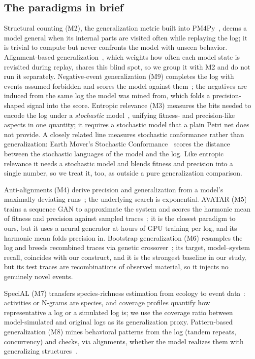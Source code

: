 \documentclass[runningheads]{llncs}
\begin{document}
\subsection{The paradigms in brief}
Structural counting (M2), the generalization metric built into PM4Py~\cite{buijs2014quality,berti2019pm4py}, deems a model general when its internal parts are visited often while replaying the log; it is trivial to compute but never confronts the model with unseen behavior. Alignment-based generalization~\cite{vanderaalst2016pm}, which weights how often each model state is revisited during replay, shares this blind spot, so we group it with M2 and do not run it separately. Negative-event generalization (M9) completes the log with events assumed forbidden and scores the model against them~\cite{vandenbroucke2014negative}; the negatives are induced from the same log the model was mined from, which folds a precision-shaped signal into the score. Entropic relevance (M3) measures the bits needed to encode the log under a \emph{stochastic} model~\cite{alkhammash2022entropic}, unifying fitness- and precision-like aspects in one quantity; it requires a stochastic model that a plain Petri net does not provide. A closely related line measures stochastic conformance rather than generalization: Earth Mover's Stochastic Conformance~\cite{leemans2019emsc} scores the distance between the stochastic languages of the model and the log. Like entropic relevance it needs a stochastic model and blends fitness and precision into a single number, so we treat it, too, as outside a pure generalization comparison.

Anti-alignments (M4) derive precision and generalization from a model's maximally deviating runs~\cite{vandongen2016anti}; the underlying search is exponential. AVATAR (M5) trains a sequence GAN to approximate the system and scores the harmonic mean of fitness and precision against sampled traces~\cite{theis2020avatar}; it is the closest paradigm to ours, but it uses a neural generator at hours of GPU training per log, and its harmonic mean folds precision in. Bootstrap generalization (M6) resamples the log and breeds recombined traces via genetic crossover~\cite{polyvyanyy2022bootstrap}; its target, model--system recall, coincides with our construct, and it is the strongest baseline in our study, but its test traces are recombinations of observed material, so it injects no genuinely novel events.

SpeciAL (M7) transfers species-richness estimation from ecology to event data~\cite{kabierski2023species}: activities or N-grams are species, and coverage profiles quantify how representative a log or a simulated log is; we use the coverage ratio between model-simulated and original logs as its generalization proxy. Pattern-based generalization (M8) mines behavioral patterns from the log (tandem repeats, concurrency) and checks, via alignments, whether the model realizes them with generalizing structures~\cite{reissner2022pattern}.
\end{document}
